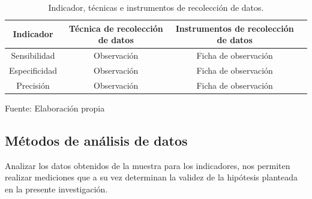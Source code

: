\begin{table}[ht!]
\centering
\caption{Indicador, técnicas e instrumentos de recolección de datos.} \vskip 0.1cm
\begin{tabular}{|c|c|c|c|}  \hline 
\bf Indicador & \bf Técnica de recolección de datos & \bf Instrumentos de recolección de datos \\ \hline 
Sensibilidad & Observación & Ficha de observación \\ \hline
Especificidad & Observación & Ficha de observación \\ \hline 
Precisión & Observación & Ficha de observación \\ \hline
\end{tabular}
\begin{center}
{\small{Fuente: Elaboración propia}}
\end{center}
\end{table}

\subsection{Métodos de análisis de datos}
Analizar los datos obtenidos de la muestra para los indicadores, nos permiten realizar mediciones que a su vez determinan la validez de la hipótesis planteada en la presente investigación. 

